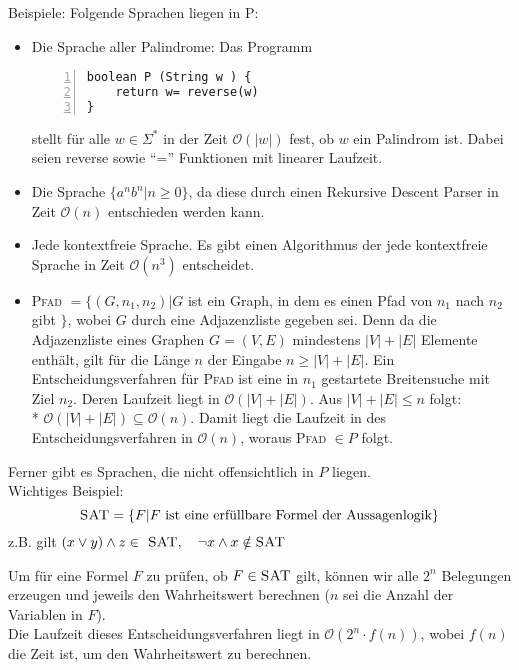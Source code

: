 \documentclass[a4paper]{scrartcl}
\begin{document}
Beispiele: Folgende Sprachen liegen in \textsc{P}:
\begin{itemize}
\item Die Sprache aller Palindrome: Das Programm
\begin{lstlisting}[numbers=left, tabsize=4, style=customc,mathescape]
boolean P (String w ) {
    return w= reverse(w)
}
\end{lstlisting}
stellt für alle $w \in \Sigma^*$ in der Zeit $\mathcal{O} (\lvert w \rvert)$ fest, ob $w$ ein Palindrom ist. Dabei seien reverse sowie "`="' Funktionen mit linearer Laufzeit.
\item Die Sprache $\{ a^nb^n | n \geq 0 \}$, da diese durch einen Rekursive Descent Parser in Zeit $\mathcal{O} (n)$ entschieden werden kann.
\item Jede kontextfreie Sprache. Es gibt einen Algorithmus der jede kontextfreie Sprache in Zeit $\mathcal{O} (n^3)$ entscheidet.
\item \textsc{Pfad} $= \{ (G,n_1,n_2) | G$ ist ein Graph, in dem es einen Pfad von $n_1$ nach $n_2$ gibt $\}$, wobei $G$ durch eine Adjazenzliste gegeben sei. Denn da die Adjazenzliste eines Graphen $G= (V,E)$ mindestens $\lvert V \rvert + \lvert E \rvert$ Elemente enthält, gilt für die Länge $n$ der Eingabe $n \geq \lvert V \rvert + \lvert E \rvert$. Ein Entscheidungsverfahren für \textsc{Pfad} ist eine in $n_1$ gestartete Breitensuche mit Ziel $n_2$. Deren Laufzeit liegt in $\mathcal{O} (\lvert V \rvert + \lvert E \rvert)$. Aus $\lvert V \rvert + \lvert E \rvert \leq n$ folgt:\\*
$\mathcal{O} (\lvert V \rvert + \lvert E \rvert) \subseteq \mathcal{O} (n)$. Damit liegt die Laufzeit in des Entscheidungsverfahren in $\mathcal{O} (n)$, woraus \textsc{Pfad} $\in P$ folgt.

\end{itemize}

Ferner gibt es Sprachen, die nicht offensichtlich in $P$ liegen.\\
Wichtiges Beispiel:
\[ \textsc{SAT} = \{ F | F \text{ ist eine erfüllbare Formel der Aussagenlogik} \}\]
z.B. gilt $(x \vee y ) \wedge z \in \textsc{ SAT}, \quad \neg x \wedge x \notin \textsc{SAT} $

Um für eine Formel $F$ zu prüfen, ob $F \in \textsc{SAT}$ gilt, können wir alle $2^n$ Belegungen erzeugen und jeweils den Wahrheitswert berechnen ($n$ sei die Anzahl der Variablen in $F$).\\
Die Laufzeit dieses Entscheidungsverfahren liegt in $\mathcal{O} (2^n \cdot f(n))$, wobei $f(n)$ die Zeit ist, um den Wahrheitswert zu berechnen.
\end{document}
